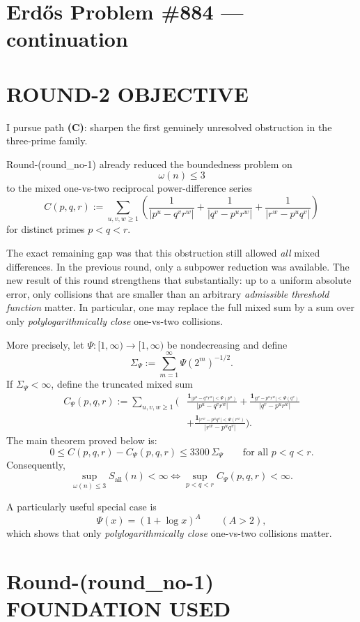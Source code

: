 \section{Erd\H{o}s Problem \#884 --- continuation}

\section{ROUND-2 OBJECTIVE}

I pursue path \textbf{(C)}: sharpen the first genuinely unresolved obstruction in the three-prime family.

Round-(round\_no-1) already reduced the boundedness problem on
\[
\omega(n)\le 3
\]
to the mixed one-vs-two reciprocal power-difference series
\[
C(p,q,r):=
\sum_{u,v,w\ge 1}
\left(
\frac{1}{|p^u-q^v r^w|}
+
\frac{1}{|q^v-p^u r^w|}
+
\frac{1}{|r^w-p^u q^v|}
\right)
\]
for distinct primes \(p<q<r\).

The exact remaining gap was that this obstruction still allowed \emph{all} mixed differences. In the previous round, only a subpower reduction was available. The new result of this round strengthens that substantially: up to a uniform absolute error, only collisions that are smaller than an arbitrary \emph{admissible threshold function} matter. In particular, one may replace the full mixed sum by a sum over only \emph{polylogarithmically close} one-vs-two collisions.

More precisely, let \(\Psi:[1,\infty)\to [1,\infty)\) be nondecreasing and define
\[
\Sigma_\Psi:=\sum_{m=1}^{\infty} \Psi(2^m)^{-1/2}.
\]
If \(\Sigma_\Psi<\infty\), define the truncated mixed sum
\[
\begin{aligned}
C_\Psi(p,q,r):=
\sum_{u,v,w\ge 1}
\Bigg(
&\frac{\mathbf 1_{|p^u-q^v r^w|<\Psi(p^u)}}{|p^u-q^v r^w|}
+
\frac{\mathbf 1_{|q^v-p^u r^w|<\Psi(q^v)}}{|q^v-p^u r^w|}
\\
&+
\frac{\mathbf 1_{|r^w-p^u q^v|<\Psi(r^w)}}{|r^w-p^u q^v|}
\Bigg).
\end{aligned}
\]
The main theorem proved below is:
\[
0\le C(p,q,r)-C_\Psi(p,q,r)\le 3300\,\Sigma_\Psi
\qquad\text{for all }p<q<r.
\]
Consequently,
\[
\sup_{\omega(n)\le 3} S_{\mathrm{all}}(n)<\infty
\iff
\sup_{p<q<r} C_\Psi(p,q,r)<\infty.
\]

A particularly useful special case is
\[
\Psi(x)=(1+\log x)^A\qquad (A>2),
\]
which shows that only \emph{polylogarithmically close} one-vs-two collisions matter.

\section{Round-(round\_no-1) FOUNDATION USED}

